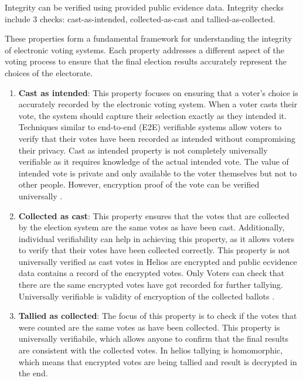 Integrity can be verified using provided public evidence data.  Integrity checks include 3 checks:
cast-as-intended, collected-as-cast and tallied-as-collected.

These properties form a fundamental framework for understanding the integrity of electronic voting systems. Each property addresses a different aspect of the voting process to ensure that the final election results accurately represent the choices of the electorate.

\begin{enumerate}
\item \textbf{Cast as intended}: This property focuses on ensuring that a voter's choice is accurately recorded by the electronic voting system. When a voter casts their vote, the system should capture their selection exactly as they intended it. Techniques similar to end-to-end (E2E) verifiable systems allow voters to verify that their votes have been recorded as intended without compromising their privacy. 
Cast as intended property is not completely universally verifiable as it requires knowledge of the actual intended vote. The value of intended vote is private and only available to the voter themselves but not to other people. However, encryption proof of the vote can be verified universally .

\item \textbf{Collected as cast}: This property ensures that the votes that are collected by the election system are the same votes as have been cast. Additionally, individual verifiability can help in achieving this property, as it allows voters to verify that their votes have been collected correctly. This property is not universally verified as cast votes in Helios are encrypted and public ecvidence data contains a record of the encrypted votes. Only Voters can check that there are the same encrypted votes have got recorded for further tallying. Universally verifiable is validity of encryoption of the collected ballots .

\item \textbf{Tallied as collected}: The focus of this property is to check if the votes that were counted are the same votes as have been collected. This property is universally verifiabile, which allows anyone to confirm that the final results are consistent with the collected votes. In helios tallying is homomorphic, which means that encrypted votes are being tallied and result is decrypted in the end.
\end{enumerate}

